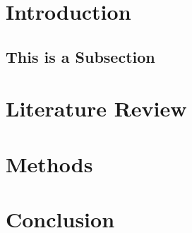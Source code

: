 \documentclass[12pt]{article}
\begin{document}


\tableofcontents
\newpage


\section{Introduction}\label{sec:intro}

\subsection{This is a Subsection}
 
%
\section{Literature Review}\label{sec:background}

%
\section{Methods}\label{sec:methods}

%
\section{Conclusion}\label{sec:conclusion}



\newpage


\end{document}
